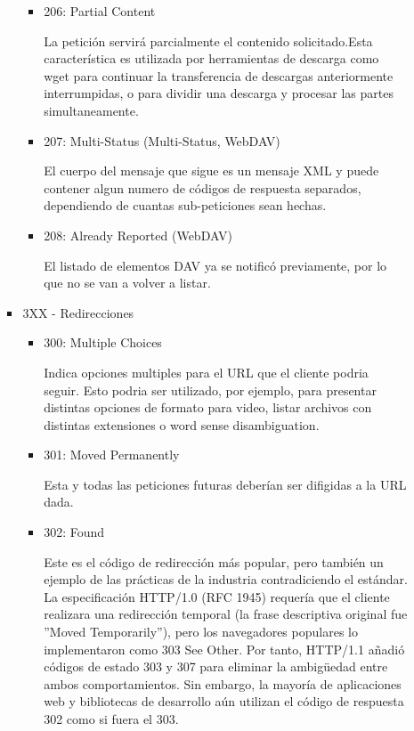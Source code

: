 \documentclass[a4paper,10pt]{article}
\begin{document}
\begin{enumerate}
\begin{enumerate}
\begin{itemize}
\begin{itemize}
                            \item 206: Partial Content

                            La petición servirá parcialmente el contenido solicitado.Esta característica es utilizada por herramientas de descarga como wget para continuar la transferencia de descargas anteriormente interrumpidas, o para dividir una descarga y procesar las partes simultaneamente.

                            \item 207: Multi-Status (Multi-Status, WebDAV)

                            El cuerpo del mensaje que sigue es un mensaje XML y puede contener algun numero de códigos de respuesta separados, dependiendo de cuantas sub-peticiones sean hechas.

                            \item 208: Already Reported (WebDAV)

                            El listado de elementos DAV ya se notificó previamente, por lo que no se van a volver a listar.
                        \end{itemize}

                    \item 3XX - Redirecciones
                        \begin{itemize}
                            \item 300: Multiple Choices

                            Indica opciones multiples para el URL que el cliente podria seguir. Esto podria ser utilizado, por ejemplo, para presentar distintas opciones de formato para video, listar archivos con distintas extensiones o word sense disambiguation.

                            \item 301: Moved Permanently

                            Esta y todas las peticiones futuras deberían ser difigidas a la URL dada.

                            \item 302: Found

                            Este es el código de redirección más popular, pero también un ejemplo de las prácticas de la industria contradiciendo el estándar. La especificación HTTP/1.0 (RFC 1945) requería que el cliente realizara una redirección temporal (la frase descriptiva original fue ”Moved Temporarily”), pero los navegadores populares lo implementaron como 303 See Other. Por tanto, HTTP/1.1 añadió códigos de estado 303 y 307 para eliminar la ambigüedad entre ambos comportamientos. Sin embargo, la mayoría de aplicaciones web y bibliotecas de desarrollo aún utilizan el código de respuesta 302 como si fuera el 303.


\end{itemize}
\end{itemize}
\end{enumerate}
\end{enumerate}
\end{document}
